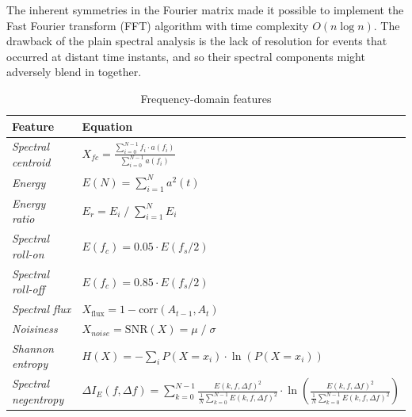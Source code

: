 The inherent symmetries in the Fourier matrix made it possible to implement the Fast Fourier transform (FFT) algorithm with time complexity $O(n \log n)$. The drawback of the plain spectral analysis is the lack of resolution for events that occurred at distant time instants, and so their spectral components might adversely blend in together. 

\begin{table}[ht]
\renewcommand{\arraystretch}{2}
\centering
\begin{tabular}{|l|l|}
\hline
\textbf{Feature}           & \textbf{Equation}                                                                                                  \\ \hline
\textit{Spectral centroid} & $ X_{fc} = \frac{\sum_{i = 0}^{N - 1}{f_i \cdot a(f_i)}}{\sum_{i = 0}^{N - 1}{a(f_i)}}$                   \\ \hline 
\textit{Energy}            & $ E(N) = \sum_{i = 1}^{N} a^2(t) $                                                                    \\ \hline \textit{Energy ratio}                & $E_r = E_i \;/\; \sum_{i = 1}^{N}{E_i} $                                                        \\ \hline
\textit{Spectral roll-on} & $ E(f_c) = 0.05 \cdot E(f_s / 2) $ \\ \hline                    
\textit{Spectral roll-off} & $ E(f_c) = 0.85 \cdot E(f_s / 2) $                                                   \\ \hline
\textit{Spectral flux}     & $X_{\mathrm{flux}} = 1 - \mathrm{corr}(A_{t-1}, A_t)$ \\ \hline 
\textit{Noisiness}                   & $X_{noise} = \mathrm{SNR}(X) = \mu \;/\; \sigma $                             \\ \hline
\textit{Shannon entropy}      & $H(X) = - \sum_{i} P(X = x_i) \cdot \ln(P(X = x_i)) $                                                  \\ \hline
\textit{Spectral negentropy}      & $\Delta I_E(f, \Delta f) = \sum_{k = 0}^{N - 1}{\frac{E(k, f, \Delta f)^2}{\frac{1}{N} \sum_{k=0}^{N-1} E(k, f, \Delta f)^2}} \cdot \ln\left(\frac{E(k, f, \Delta f)^2}{\frac{1}{N} \sum_{k=0}^{N-1} E(k, f, \Delta f)^2}\right)$                                                \\ \hline
\end{tabular}
\caption{Frequency-domain features}
\label{tab:fd-features}
\end{table}


